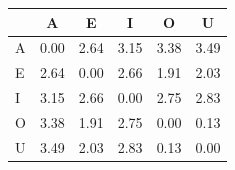 \begin{tabular}{lccccc}
\toprule
\rowcolor{col01}
 & A & E & I & O & U \\
\midrule
A & 0.00 & 2.64 & 3.15 & 3.38 & 3.49 \\
E & 2.64 & 0.00 & 2.66 & 1.91 & 2.03 \\
I & 3.15 & 2.66 & 0.00 & 2.75 & 2.83 \\
O & 3.38 & 1.91 & 2.75 & 0.00 & 0.13 \\
U & 3.49 & 2.03 & 2.83 & 0.13 & 0.00 \\
\bottomrule
\end{tabular}
